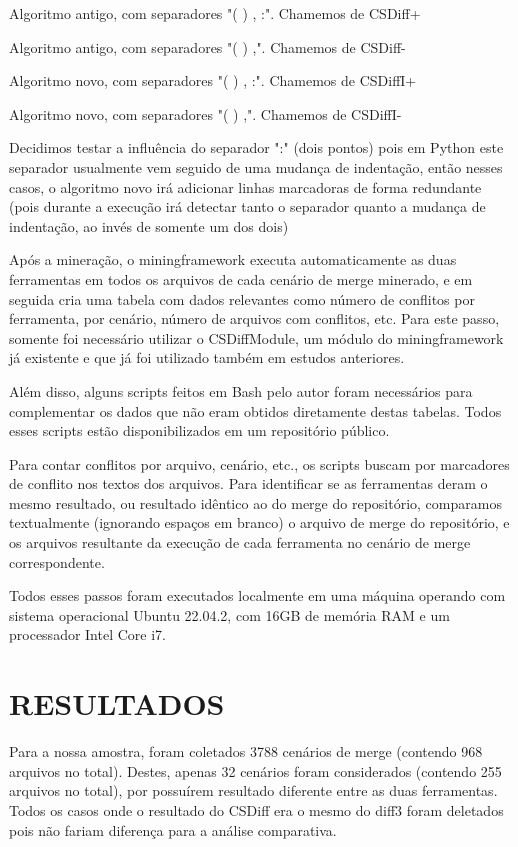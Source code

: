 \begin{compactenum}[(1)]
	\item Algoritmo antigo, com separadores "( ) , :". Chamemos de CSDiff+
	\item Algoritmo antigo, com separadores "( ) ,". Chamemos de CSDiff-
	\item Algoritmo novo, com separadores "( ) , :". Chamemos de CSDiffI+
	\item Algoritmo novo, com separadores "( ) ,". Chamemos de CSDiffI-
\end{compactenum}

Decidimos testar a influência do separador ":" (dois pontos) pois em Python este separador usualmente vem seguido de uma
mudança de indentação, então nesses casos, o algoritmo novo irá adicionar linhas marcadoras de forma redundante (pois
durante a execução irá detectar tanto o separador quanto a mudança de indentação, ao invés de somente um dos dois)

Após a mineração, o miningframework executa automaticamente as duas ferramentas em todos os arquivos de cada cenário de merge
minerado, e em seguida cria uma tabela com dados relevantes como número de conflitos por
ferramenta, por cenário, número de arquivos com conflitos, etc. Para este passo, somente foi necessário utilizar
o CSDiffModule, um módulo do miningframework já existente e que já foi utilizado também em estudos anteriores.

Além disso, alguns scripts feitos em Bash pelo autor foram necessários para complementar os dados que não eram obtidos
diretamente destas tabelas. Todos esses scripts estão disponibilizados em um repositório público. %

Para contar conflitos por arquivo,
cenário, etc., os scripts buscam por marcadores
de conflito nos textos dos arquivos. Para identificar se as ferramentas deram o mesmo resultado,
ou resultado idêntico ao do merge
do repositório, comparamos textualmente (ignorando espaços em
branco) o arquivo de merge do repositório, e os arquivos resultante da execução de cada
ferramenta no cenário de merge correspondente.

Todos esses passos foram executados localmente em uma máquina operando com sistema operacional Ubuntu 22.04.2,
com 16GB de memória
RAM e um processador Intel Core i7.

\section{RESULTADOS}
Para a nossa amostra, foram coletados 3788 cenários de merge (contendo 968 arquivos
no total). Destes, apenas 32 cenários foram considerados (contendo 255 arquivos no total), por possuírem resultado
diferente entre as duas ferramentas. Todos os casos onde o resultado do CSDiff era o mesmo do diff3
foram deletados pois não fariam
diferença para a análise comparativa.

